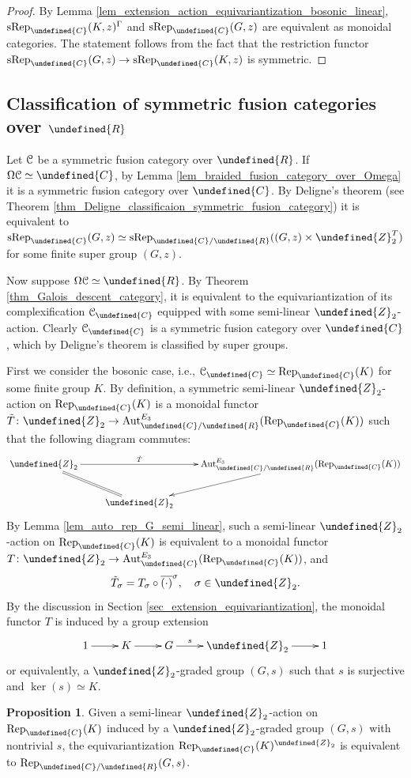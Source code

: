 \documentclass[10pt]{article}
\let\mathbb\undefined
\theoremstyle{definition}
\newtheorem{prop}[thm]{Proposition}
\numberwithin{equation}{section}
\numberwithin{thm}{section}
\newcommand{\pf}{\begin{proof}}
\newcommand{\epf}{\end{proof}}
\newcommand{\Cb}{\mathbb{C}}
\newcommand{\Rb}{\mathbb{R}}
\newcommand{\Zb}{\mathbb{Z}}
\newcommand{\CC}{\EuScript{C}}
\DeclareMathOperator{\Aut}{Aut}
\newcommand{\rep}{\mathrm{Rep}}
\newcommand{\srep}{\mathrm{sRep}}
\begin{document}
\pf
By Lemma \ref{lem_extension_action_equivariantization_bosonic_linear}, $\srep_\Cb(K,z)^\Gamma$ and $\srep_\Cb(G,z)$ are equivalent as monoidal categories. The statement follows from the fact that the restriction functor $\srep_\Cb(G,z) \to \srep_\Cb(K,z)$ is symmetric.
\epf

\subsection{Classification of symmetric fusion categories over \texorpdfstring{$\Rb$}{R}}

Let $\CC$ be a symmetric fusion category over $\Rb$. If $\Omega \CC \simeq \Cb$, by Lemma \ref{lem_braided_fusion_category_over_Omega} it is a symmetric fusion category over $\Cb$. By Deligne's theorem (see Theorem \ref{thm_Deligne_classificaion_symmetric_fusion_category}) it is equivalent to $\srep_\Cb(G,z) \simeq \srep_{\Cb/\Rb}((G,z) \times \Zb_2^T)$ for some finite super group $(G,z)$.

Now suppose $\Omega \CC \simeq \Rb$. By Theorem \ref{thm_Galois_descent_category}, it is equivalent to the equivariantization of its complexification $\CC_\Cb$ equipped with some semi-linear $\Zb_2$-action. Clearly $\CC_\Cb$ is a symmetric fusion category over $\Cb$, which by Deligne's theorem is classified by super groups.

First we consider the bosonic case, i.e., $\CC_\Cb \simeq \rep_\Cb(K)$ for some finite group $K$. By definition, a symmetric semi-linear $\Zb_2$-action on $\rep_\Cb(K)$ is a monoidal functor $\tilde T \colon \Zb_2 \to \Aut_{\Cb/\Rb}^{E_3}(\rep_\Cb(K))$ such that the following diagram commutes:
\[
\xymatrix{
\Zb_2 \ar[rr]^-{\tilde T} \ar@{=}[dr] & & \Aut_{\Cb/\Rb}^{E_3}(\rep_\Cb(K)) \ar[dl] \\
 & \Zb_2
}
\]
By Lemma \ref{lem_auto_rep_G_semi_linear}, such a semi-linear $\Zb_2$-action on $\rep_\Cb(K)$ is equivalent to a monoidal functor $T \colon \Zb_2 \to \Aut_\Cb^{E_3}(\rep_\Cb(K))$, and
\[
\tilde T_\sigma = T_\sigma \circ \overline{(\cdot)}^\sigma , \quad \sigma \in \Zb_2 .
\]
By the discussion in Section \ref{sec_extension_equivariantization}, the monoidal functor $T$ is induced by a group extension
\[
\xymatrix{
1 \ar[r] & K \ar[r] & G \ar[r]^-{s} & \Zb_2 \ar[r] & 1
}
\]
or equivalently, a $\Zb_2$-graded group $(G,s)$ such that $s$ is surjective and $\ker(s) \simeq K$.

\begin{prop} \label{prop_extension_action_equivariantization_bosonic_semi_linear}
Given a semi-linear $\Zb_2$-action on $\rep_\Cb(K)$ induced by a $\Zb_2$-graded group $(G,s)$ with nontrivial $s$, the equivariantization $\rep_\Cb(K)^{\Zb_2}$ is equivalent to $\rep_{\Cb/\Rb}(G,s)$.
\end{prop}
\end{document}
